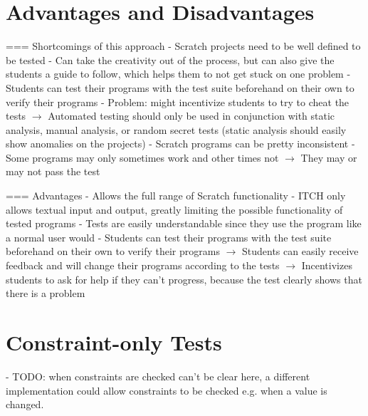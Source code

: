 \section{Advantages and Disadvantages}

=== Shortcomings of this approach
- Scratch projects need to be well defined to be tested
    - Can take the creativity out of the process, but can also give the students a guide to follow, which helps them to not get stuck on one problem
    - Students can test their programs with the test suite beforehand on their own to verify their programs
    - Problem: might incentivize students to try to cheat the tests
        $\rightarrow$ Automated testing should only be used in conjunction with static analysis, manual analysis, or random secret tests
        (static analysis should easily show anomalies on the projects)
- Scratch programs can be pretty inconsistent
    - Some programs may only sometimes work and other times not
    $\rightarrow$ They may or may not pass the test

=== Advantages
- Allows the full range of Scratch functionality
    - ITCH only allows textual input and output, greatly limiting the possible functionality of tested programs
- Tests are easily understandable since they use the program like a normal user would
    - Students can test their programs with the test suite beforehand on their own to verify their programs
        $\rightarrow$ Students can easily receive feedback and will change their programs according to the tests
        $\rightarrow$ Incentivizes students to ask for help if they can't progress, because the test clearly shows that there is a problem

\section{Constraint-only Tests}%
\label{sec:constraint_only_tests}

- TODO: when constraints are checked can't be clear here, a different implementation could allow constraints to be checked e.g. when a value is changed.

